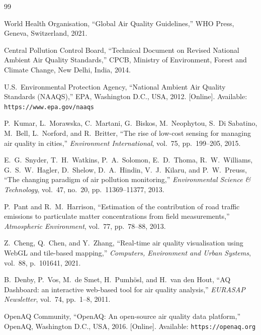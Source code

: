 \documentclass[12pt,a4paper]{article}
\begin{document}
\begin{thebibliography}{99}

World Health Organisation,
``Global Air Quality Guidelines,''
WHO Press, Geneva, Switzerland, 2021.

Central Pollution Control Board,
``Technical Document on Revised National Ambient Air Quality Standards,''
CPCB, Ministry of Environment, Forest and Climate Change, New Delhi, India, 2014.

U.S.\ Environmental Protection Agency,
``National Ambient Air Quality Standards (NAAQS),''
EPA, Washington D.C., USA, 2012. [Online]. Available: \texttt{https://www.epa.gov/naaqs}

P.\ Kumar, L.\ Morawska, C.\ Martani, G.\ Biskos, M.\ Neophytou,
S.\ Di Sabatino, M.\ Bell, L.\ Norford, and R.\ Britter,
``The rise of low-cost sensing for managing air quality in cities,''
\emph{Environment International}, vol.\ 75, pp.\ 199--205, 2015.

E.\ G.\ Snyder, T.\ H.\ Watkins, P.\ A.\ Solomon, E.\ D.\ Thoma,
R.\ W.\ Williams, G.\ S.\ W.\ Hagler, D.\ Shelow, D.\ A.\ Hindin,
V.\ J.\ Kilaru, and P.\ W.\ Preuss,
``The changing paradigm of air pollution monitoring,''
\emph{Environmental Science \& Technology}, vol.\ 47, no.\ 20,
pp.\ 11369--11377, 2013.

P.\ Pant and R.\ M.\ Harrison,
``Estimation of the contribution of road traffic emissions to
particulate matter concentrations from field measurements,''
\emph{Atmospheric Environment}, vol.\ 77, pp.\ 78--88, 2013.

Z.\ Cheng, Q.\ Chen, and Y.\ Zhang,
``Real-time air quality visualisation using WebGL and tile-based mapping,''
\emph{Computers, Environment and Urban Systems}, vol.\ 88, p.\ 101641, 2021.

B.\ Denby, P.\ Vos, M.\ de Smet, H.\ Pumh{\"o}sl, and H.\ van den Hout,
``AQ Dashboard: an interactive web-based tool for air quality analysis,''
\emph{EURASAP Newsletter}, vol.\ 74, pp.\ 1--8, 2011.

OpenAQ Community,
``OpenAQ: An open-source air quality data platform,''
OpenAQ, Washington D.C., USA, 2016. [Online]. Available:
\texttt{https://openaq.org}


\end{thebibliography}
\end{document}

